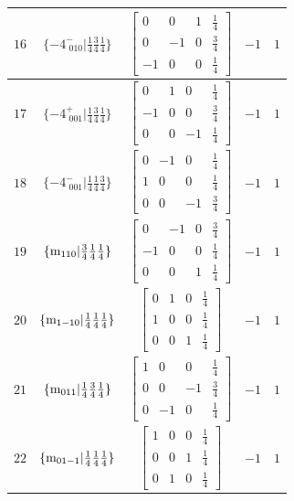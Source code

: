 \documentclass[fleqn,8pt]{jsarticle}
\begin{document}
\begin{longtable}{ccccc}
$ 16 $ & $ \{-4^{-}_{\,\,010}|\frac{1}{4} \frac{3}{4} \frac{1}{4}\} $ & $ \begin{bmatrix} 0 & 0 & 1 & \frac{1}{4} \\ 0 & -1 & 0 & \frac{3}{4} \\ -1 & 0 & 0 & \frac{1}{4} \end{bmatrix} $ & $ -1 $ & $ 1 $ \\ \hline
$ 17 $ & $ \{-4^{+}_{\,\,001}|\frac{1}{4} \frac{3}{4} \frac{1}{4}\} $ & $ \begin{bmatrix} 0 & 1 & 0 & \frac{1}{4} \\ -1 & 0 & 0 & \frac{3}{4} \\ 0 & 0 & -1 & \frac{1}{4} \end{bmatrix} $ & $ -1 $ & $ 1 $ \\ \hline
$ 18 $ & $ \{-4^{-}_{\,\,001}|\frac{1}{4} \frac{1}{4} \frac{3}{4}\} $ & $ \begin{bmatrix} 0 & -1 & 0 & \frac{1}{4} \\ 1 & 0 & 0 & \frac{1}{4} \\ 0 & 0 & -1 & \frac{3}{4} \end{bmatrix} $ & $ -1 $ & $ 1 $ \\ \hline
$ 19 $ & $ \{{\rm m}_{110}|\frac{3}{4} \frac{1}{4} \frac{1}{4}\} $ & $ \begin{bmatrix} 0 & -1 & 0 & \frac{3}{4} \\ -1 & 0 & 0 & \frac{1}{4} \\ 0 & 0 & 1 & \frac{1}{4} \end{bmatrix} $ & $ -1 $ & $ 1 $ \\ \hline
$ 20 $ & $ \{{\rm m}_{1-10}|\frac{1}{4} \frac{1}{4} \frac{1}{4}\} $ & $ \begin{bmatrix} 0 & 1 & 0 & \frac{1}{4} \\ 1 & 0 & 0 & \frac{1}{4} \\ 0 & 0 & 1 & \frac{1}{4} \end{bmatrix} $ & $ -1 $ & $ 1 $ \\ \hline
$ 21 $ & $ \{{\rm m}_{011}|\frac{1}{4} \frac{3}{4} \frac{1}{4}\} $ & $ \begin{bmatrix} 1 & 0 & 0 & \frac{1}{4} \\ 0 & 0 & -1 & \frac{3}{4} \\ 0 & -1 & 0 & \frac{1}{4} \end{bmatrix} $ & $ -1 $ & $ 1 $ \\ \hline
$ 22 $ & $ \{{\rm m}_{01-1}|\frac{1}{4} \frac{1}{4} \frac{1}{4}\} $ & $ \begin{bmatrix} 1 & 0 & 0 & \frac{1}{4} \\ 0 & 0 & 1 & \frac{1}{4} \\ 0 & 1 & 0 & \frac{1}{4} \end{bmatrix} $ & $ -1 $ & $ 1 $ \\ \hline

\end{longtable}
\end{document}
